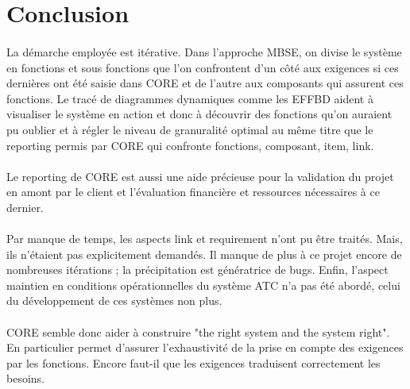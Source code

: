 \section*{Conclusion}


\paragraph{}
La démarche employée est itérative. Dans l'approche MBSE, on divise le système en fonctions et sous fonctions que l'on confrontent d'un côté aux exigences si ces dernières ont été saisie dans CORE et de l'autre aux composants qui assurent ces fonctions. Le tracé de diagrammes dynamiques comme les EFFBD aident à visualiser le système en action et donc à découvrir des fonctions qu'on auraient pu oublier et à régler le niveau de granuralité optimal au même titre que le reporting permis par CORE qui confronte fonctions, composant, item, link.  

\paragraph{}
Le reporting de CORE est aussi une aide précieuse pour la validation du projet en amont par le client et l'évaluation financière et ressources nécessaires à ce dernier.

\paragraph{}
Par manque de temps, les aspects link et requirement n'ont pu être traités. Mais, ils n'étaient pas explicitement demandés. Il manque de plus à ce projet encore de nombreuses itérations ; la précipitation est génératrice de bugs. Enfin, l'aspect maintien en conditions opérationnelles du système ATC n'a pas été abordé, celui du développement de ces systèmes non plus.

\paragraph{}
CORE semble donc aider à construire "the right system and the system right". En particulier permet d'assurer
l'exhaustivité de la prise en compte des exigences par les fonctions. Encore faut-il que les exigences traduisent correctement les besoins.